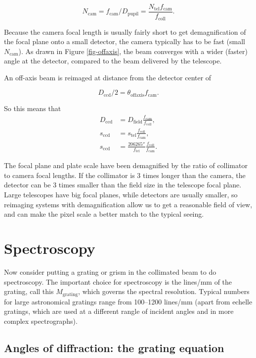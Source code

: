 \documentclass[12pt]{article}
\begin{document}
$$ N_{\mathrm{cam}} = f_{\mathrm{cam}} / D_{\mathrm{pupil}} = \frac{N_{\mathrm{tel}} f_{\mathrm{cam}}}{f_{\mathrm{coll}}}. $$

Because the camera focal length is usually fairly short to
get demagnification of the focal plane onto a small detector,
the camera typically has to be fast (small $N_{\mathrm{cam}}$).  As drawn in Figure
\ref{fig-offaxis}, the beam converges with a wider (faster) angle
at the detector, compared to the beam delivered by the telescope.

An off-axis beam is reimaged at distance from the detector center of 

$$ D_{\mathrm{ccd}}/2 = \theta_{\mathrm{offaxis}} f_{\mathrm{cam}}. $$

So this means that
\begin{align*}
D_{\mathrm{ccd}} &= D_{\mathrm{field}} \frac{f_{\mathrm{cam}}}{f_{\mathrm{coll}}}, \\
s_{\mathrm{ccd}} &= s_{\mathrm{tel}} \frac{f_{\mathrm{coll}}}{f_{\mathrm{cam}}}, \\
s_{\mathrm{ccd}} &= \frac{206265''}{f_{\mathrm{tel}}} \frac{f_{\mathrm{coll}}}{f_{\mathrm{cam}}}.
\end{align*}


The focal plane and plate scale have been demagnified by the 
ratio of collimator to camera focal lengths.  If the collimator
is 3 times longer than the camera, the detector can be 3 times smaller
than the field size in the telescope focal plane.
Large telescopes have big focal planes, while detectors are 
usually smaller, so reimaging systems with demagnification 
allow us to get a reasonable field of view, and can
make the pixel scale a better match to the typical seeing.


\section{Spectroscopy}

Now consider putting a grating or grism in the collimated
beam to do spectroscopy.  The important choice for spectroscopy
is the lines/mm of the grating, call this $M_{\mathrm{grating}}$, which 
governs the spectral resolution.  Typical numbers 
for large astronomical gratings range from 100--1200 lines/mm
(apart from echelle gratings, which are used at a different 
rangle of incident angles and in more complex spectrographs).

\subsection{Angles of diffraction: the grating equation}
\end{document}
